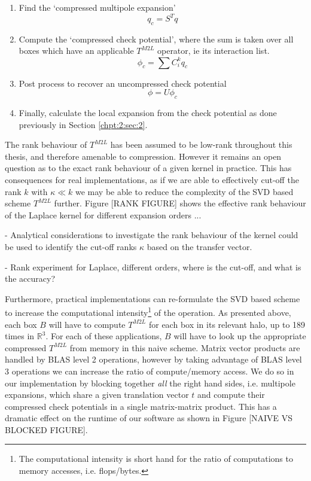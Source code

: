 \begin{enumerate}
    \item Find the `compressed multipole expansion'
    \[
    q_c = S^T q
    \]
    \item Compute the `compressed check potential', where the sum is taken over all boxes which have an applicable $T^{M2L}$ operator, ie its interaction list.
    \[
    \phi_c = \sum C^k_i q_c
    \]
    \item Post process to recover an uncompressed check potential
    \[
    \phi = U \phi_c
    \]
    \item Finally, calculate the local expansion from the check potential as done previously in Section \ref{chpt:2:sec:2}.
\end{enumerate}


The rank behaviour of $T^{M2L}$ has been assumed to be low-rank throughout this thesis, and therefore amenable to compression. However it remains an open question as to the exact rank behaviour of a given kernel in practice. This has consequences for real implementations, as if we are able to effectively cut-off the rank $k$ with $\kappa \ll k$ we may be able to reduce the complexity of the SVD based scheme $T^{M2L}$ further. Figure [RANK FIGURE] shows the effective rank behaviour of the Laplace kernel for different expansion orders ...

- Analytical considerations to investigate the rank behaviour of the kernel could be used to identify the cut-off ranks $\kappa$ based on the transfer vector.

- Rank experiment for Laplace, different orders, where is the cut-off, and what is the accuracy?

Furthermore, practical implementations can re-formulate the SVD based scheme to increase the computational intensity\footnote{The computational intensity is short hand for the ratio of computations to memory accesses, i.e. flops/bytes.} of the operation. As presented above, each box $B$ will have to compute $T^{M2L}$ for each box in its relevant halo, up to 189 times in $\mathbb{R}^3$. For each of these applications, $B$ will have to look up the appropriate compressed $T^{M2L}$ from memory in this naive scheme. Matrix vector products are handled by BLAS level 2 operations, however by taking advantage of BLAS level 3 operations we can increase the ratio of compute/memory access. We do so in our implementation by blocking together \textit{all} the right hand sides, i.e. multipole expansions, which share a given translation vector $t$ and compute their compressed check potentials in a single matrix-matrix product. This has a dramatic effect on the runtime of our software as shown in Figure [NAIVE VS BLOCKED FIGURE].

